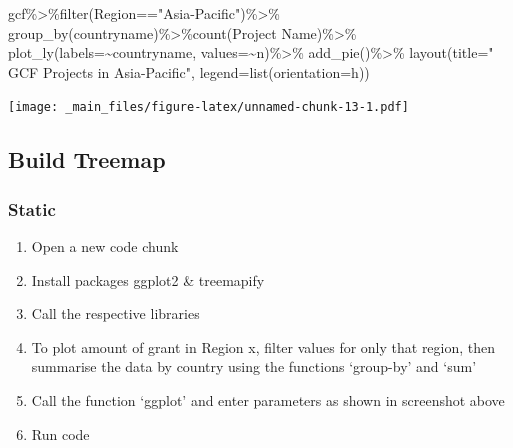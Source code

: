 \documentclass[
]{book}
\newenvironment{Shaded}{\begin{snugshade}}{\end{snugshade}}
\newcommand{\AttributeTok}[1]{\textcolor[rgb]{0.77,0.63,0.00}{#1}}
\newcommand{\FunctionTok}[1]{\textcolor[rgb]{0.00,0.00,0.00}{#1}}
\newcommand{\NormalTok}[1]{#1}
\newcommand{\SpecialCharTok}[1]{\textcolor[rgb]{0.00,0.00,0.00}{#1}}
\newcommand{\StringTok}[1]{\textcolor[rgb]{0.31,0.60,0.02}{#1}}
\providecommand{\tightlist}{%
  \setlength{\itemsep}{0pt}\setlength{\parskip}{0pt}}
\begin{document}
\begin{Shaded}
\begin{Highlighting}[]
\NormalTok{gcf}\SpecialCharTok{\%\textgreater{}\%}\FunctionTok{filter}\NormalTok{(Region}\SpecialCharTok{==}\StringTok{"Asia{-}Pacific"}\NormalTok{)}\SpecialCharTok{\%\textgreater{}\%}
  \FunctionTok{group\_by}\NormalTok{(countryname)}\SpecialCharTok{\%\textgreater{}\%}\FunctionTok{count}\NormalTok{(}\StringTok{\textasciigrave{}}\AttributeTok{Project Name}\StringTok{\textasciigrave{}}\NormalTok{)}\SpecialCharTok{\%\textgreater{}\%}
        \FunctionTok{plot\_ly}\NormalTok{(}\AttributeTok{labels=}\SpecialCharTok{\textasciitilde{}}\NormalTok{countryname, }\AttributeTok{values=}\SpecialCharTok{\textasciitilde{}}\NormalTok{n)}\SpecialCharTok{\%\textgreater{}\%}
    \FunctionTok{add\_pie}\NormalTok{()}\SpecialCharTok{\%\textgreater{}\%}
    \FunctionTok{layout}\NormalTok{(}\AttributeTok{title=}\StringTok{" GCF Projects in Asia{-}Pacific"}\NormalTok{,}
           \AttributeTok{legend=}\FunctionTok{list}\NormalTok{(}\AttributeTok{orientation=}\StringTok{\textquotesingle{}h\textquotesingle{}}\NormalTok{))}
\end{Highlighting}
\end{Shaded}

\texttt{[image: \_main\_files/figure-latex/unnamed-chunk-13-1.pdf]}

\hypertarget{build-treemap}{%
\subsection{Build Treemap}\label{build-treemap}}

\hypertarget{static}{%
\subsubsection{Static}\label{static}}

\begin{enumerate}
\def\labelenumi{\arabic{enumi}.}
\tightlist
\item
  Open a new code chunk
\item
  Install packages ggplot2 \& treemapify
\item
  Call the respective libraries
\item
  To plot amount of grant in Region x, filter values for only that region,
  then summarise the data by country using the functions `group-by' and `sum'
\item
  Call the function `ggplot' and enter parameters as shown in screenshot above
\item
  Run code
\end{enumerate}
\end{document}
